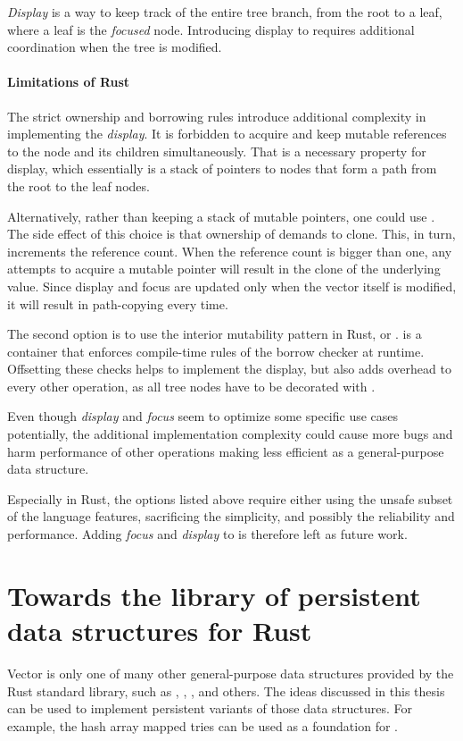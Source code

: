 \emph{Display} is a way to keep track of the entire tree branch, from the root to a leaf, where a leaf is the \emph{focused} node. Introducing display to \rrbtree{} requires additional coordination when the tree is modified.

\paragraph{Limitations of Rust}
The strict ownership and borrowing rules introduce additional complexity in implementing the \emph{display}. It is forbidden to acquire and keep mutable references to the node and its children simultaneously. That is a necessary property for display, which essentially is a stack of pointers to nodes that form a path from the root to the leaf nodes.

Alternatively, rather than keeping a stack of mutable pointers, one could use \rc{}. The side effect of this choice is that ownership of \rc{} demands to clone. This, in turn, increments the reference count. When the reference count is bigger than one, any attempts to acquire a mutable pointer will result in the clone of the underlying value. Since display and focus are updated only when the vector itself is modified, it will result in path-copying every time.

The second option is to use the interior mutability pattern in Rust, or .  is a container that enforces compile-time rules of the borrow checker at runtime. Offsetting these checks helps to implement the display, but also adds overhead to every other operation, as all tree nodes have to be decorated with .

Even though \emph{display} and \emph{focus} seem to optimize some specific use cases potentially, the additional implementation complexity could cause more bugs and harm performance of other operations making \rrbtree{} less efficient as a general-purpose data structure.

Especially in Rust, the options listed above require either using the unsafe subset of the language features, sacrificing the simplicity, and possibly the reliability and performance. Adding \emph{focus} and \emph{display} to \rrbvec{} is therefore left as future work.

\section{Towards the library of persistent data structures for Rust}
Vector is only one of many other general-purpose data structures provided by the Rust standard library, such as , , , and others. The ideas discussed in this thesis can be used to implement persistent variants of those data structures. For example, the hash array mapped tries \cite{ideal-hash-trees} can be used as a foundation for .

